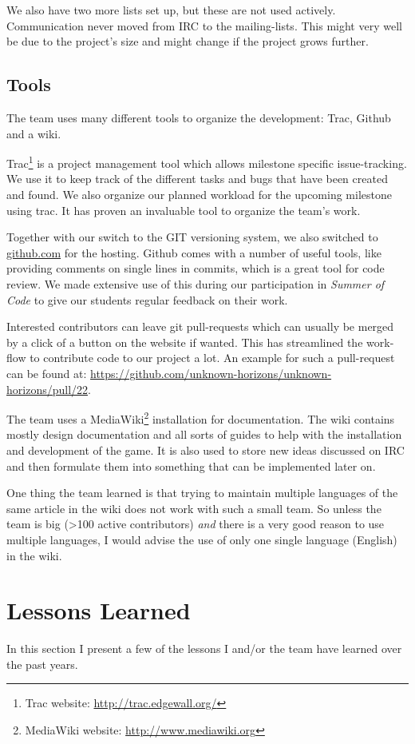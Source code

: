 We also have two more lists set up, but these are not used actively. Communication never moved from IRC to the
mailing-lists. This might very well be due to the project's size and might change if the project grows further.

\subsection{Tools}
The team uses many different tools to organize the development: Trac, Github and a wiki.

Trac\footnote{Trac website: \url{http://trac.edgewall.org/}} is a project management tool which allows milestone specific issue-tracking. We use it to keep track of the
different tasks and bugs that have been created and found. We also organize our planned workload for the upcoming
milestone using trac. It has proven an invaluable tool to organize the team's work.

Together with our switch to the GIT versioning system, we also switched to \href{http://www.github.com}{github.com} for the hosting. Github comes with a
number of useful tools, like providing comments on single lines in commits, which is a great tool for code review. We made
extensive use of this during our participation in \textit{Summer of Code} to give our students regular feedback on
their work.

Interested contributors can leave git pull-requests which can usually be merged by a click of a button on
the website if wanted. This has streamlined the work-flow to contribute code to our project a lot. An example for such a
pull-request can be found at: \url{https://github.com/unknown-horizons/unknown-horizons/pull/22}.

The team uses a MediaWiki\footnote{MediaWiki website: \url{http://www.mediawiki.org}} installation for documentation.
The wiki contains mostly design documentation and all sorts of
guides to help with the installation and development of the game. It is also used to store new ideas discussed on IRC
and then formulate them into something that can be implemented later on.

One thing the team learned is that trying to
maintain multiple languages of the same article in the wiki does not work with such a small team. So unless the team is
big (>100 active contributors) \textit{and} there is a very good reason to use multiple languages, I would advise the use of only
one single language (English) in the wiki.

\section{Lessons Learned}
In this section I present a few of the lessons I and/or the team have learned over the past years.

